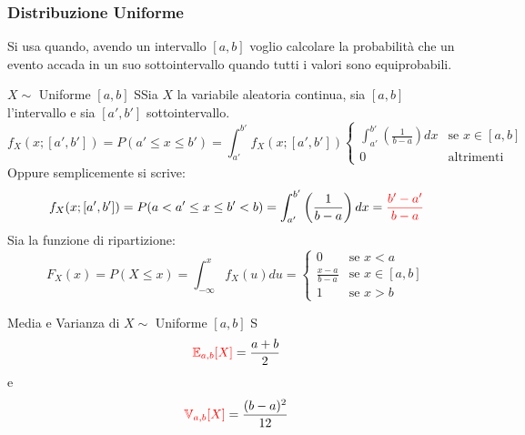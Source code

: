 \documentclass{article}  %
\theoremstyle{definition}
\begin{document}
\subsubsection{Distribuzione Uniforme}
Si usa quando, avendo un intervallo $[a,b]$ voglio calcolare la probabilità che un evento accada in un suo sottointervallo quando tutti i valori sono equiprobabili.
\begin{theorem}{$X \sim$ Uniforme $[a,b]$}
	SSia $X$ la variabile aleatoria continua, sia $[a,b]$ l'intervallo e sia $[a',b']$ sottointervallo.
	\[
		f_X(x;[a',b'])=P(a' \leq x \leq b')= \int_{a'}^{b'}f_X(x;[a',b'])
		\begin{cases}
			\int_{a'}^{b'}\left(\frac{1}{b-a}\right)dx & \text{se } x \in[a,b] \\
			0                                          & \text{altrimenti }
		\end{cases}
	\]
	Oppure semplicemente si scrive:
	\[
		f_X(x;[a',b'])=P(a < a' \leq x \leq b' < b)=\int_{a'}^{b'}\left(\frac{1}{b-a}\right)dx=\textcolor{red}{\frac{b'-a'}{b-a}}
	\]
	Sia la funzione di ripartizione:
	\[
		F_X(x)=P(X \leq x)=\int_{-\infty}^{x}f_X(u)du=
		\begin{cases}
			0               & \text{se } x < a      \\
			\frac{x-a}{b-a} & \text{se } x \in[a,b] \\
			1               & \text{se } x >b
		\end{cases}
	\]
\end{theorem}
\begin{theorem}{Media e Varianza di $X \sim$ Uniforme $[a,b]$}
	S\[
		\textcolor{red}{\mathbb{E}_{a,b}[X]}=\frac{a+b}{2}
	\]
	e
	\[
		\textcolor{red}{\mathbb{V}_{a,b}[X]}=\frac{(b-a)^2}{12}
	\]
\end{theorem}
\end{document}
